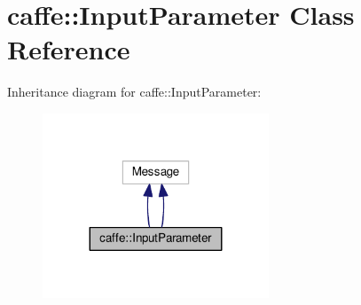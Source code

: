 \hypertarget{classcaffe_1_1_input_parameter}{}\section{caffe\+:\+:Input\+Parameter Class Reference}
\label{classcaffe_1_1_input_parameter}


Inheritance diagram for caffe\+:\+:Input\+Parameter\+:
\nopagebreak
\begin{figure}[H]
\begin{center}
\leavevmode
\includegraphics[width=191pt]{classcaffe_1_1_input_parameter__inherit__graph}
\end{center}
\end{figure}
